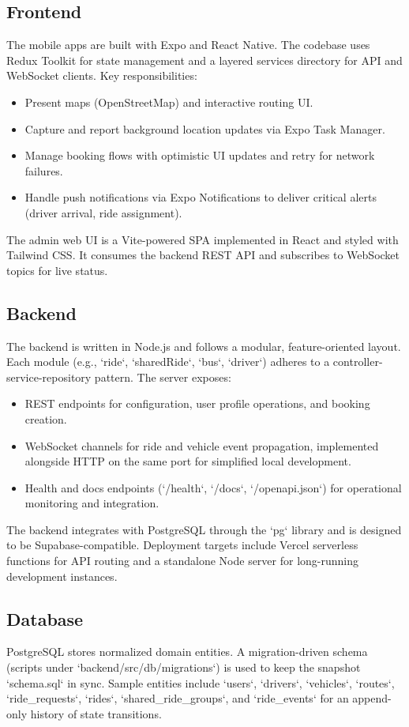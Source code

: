 \documentclass[12pt,a4paper]{article}
\begin{document}
\subsection{Frontend}
The mobile apps are built with Expo and React Native. The codebase uses Redux Toolkit for state management and a layered services directory for API and WebSocket clients. Key responsibilities:
\begin{itemize}
  \item Present maps (OpenStreetMap) and interactive routing UI.
  \item Capture and report background location updates via Expo Task Manager.
  \item Manage booking flows with optimistic UI updates and retry for network failures.
  \item Handle push notifications via Expo Notifications to deliver critical alerts (driver arrival, ride assignment).
\end{itemize}

The admin web UI is a Vite-powered SPA implemented in React and styled with Tailwind CSS. It consumes the backend REST API and subscribes to WebSocket topics for live status.

\subsection{Backend}
The backend is written in Node.js and follows a modular, feature-oriented layout. Each module (e.g., `ride`, `sharedRide`, `bus`, `driver`) adheres to a controller-service-repository pattern. The server exposes:
\begin{itemize}
  \item REST endpoints for configuration, user profile operations, and booking creation.
  \item WebSocket channels for ride and vehicle event propagation, implemented alongside HTTP on the same port for simplified local development.
  \item Health and docs endpoints (`/health`, `/docs`, `/openapi.json`) for operational monitoring and integration.
\end{itemize}

The backend integrates with PostgreSQL through the `pg` library and is designed to be Supabase-compatible. Deployment targets include Vercel serverless functions for API routing and a standalone Node server for long-running development instances.

\subsection{Database}
PostgreSQL stores normalized domain entities. A migration-driven schema (scripts under `backend/src/db/migrations`) is used to keep the snapshot `schema.sql` in sync. Sample entities include `users`, `drivers`, `vehicles`, `routes`, `ride_requests`, `rides`, `shared_ride_groups`, and `ride_events` for an append-only history of state transitions.
\end{document}
